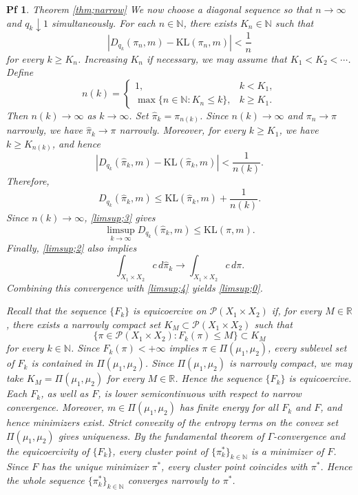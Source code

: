 \documentclass[10pt,a4paper]{amsart}
\newtheorem{pf}{Pf}
\newcommand{\N}{\mathbb N}
\newcommand{\R}{\mathbb R}
\begin{document}
\begin{pf}{Theorem \ref{thm;narrow}}
We now choose a diagonal sequence so that $n\to\infty$ and $q_k\downarrow1$ simultaneously. For each $n\in\N$, there exists $K_n\in\N$ such that
\begin{equation*}
|D_{q_k}(\pi_n,m)-\mathrm{KL}(\pi_n,m)|<\frac{1}{n}
\end{equation*}
for every $k\geq K_n$. Increasing $K_n$ if necessary, we may assume that $K_1<K_2<\cdots$. Define
\begin{equation*}
n(k)=
\begin{cases}
1, & k<K_1,\\
\max\{n\in\N:K_n\leq k\}, & k\geq K_1.
\end{cases}
\end{equation*}
Then $n(k)\to\infty$ as $k\to\infty$. Set $\hat{\pi}_k=\pi_{n(k)}$. Since $n(k)\to\infty$ and $\pi_n\to\pi$ narrowly, we have $\hat{\pi}_k\to\pi$ narrowly. Moreover, for every $k\geq K_1$, we have $k\geq K_{n(k)}$, and hence
\begin{equation*}
|D_{q_k}(\hat{\pi}_k,m)-\mathrm{KL}(\hat{\pi}_k,m)|<\frac{1}{n(k)}.
\end{equation*}
Therefore,
\begin{equation*}
D_{q_k}(\hat{\pi}_k,m)\leq\mathrm{KL}(\hat{\pi}_k,m)+\frac{1}{n(k)}.
\end{equation*}
Since $n(k)\to\infty$, \eqref{limsup;3} gives
\begin{equation}\label{limsup;4}
\limsup_{k\to\infty}D_{q_k}(\hat{\pi}_k,m)\leq\mathrm{KL}(\pi,m).
\end{equation}
Finally, \eqref{limsup;2} also implies
\begin{equation*}
\int_{X_1\times X_2}c\,d\hat{\pi}_k\to\int_{X_1\times X_2}c\,d\pi.
\end{equation*}
Combining this convergence with \eqref{limsup;4} yields \eqref{limsup;0}.

Recall that the sequence $\{F_k\}$ is equicoercive on $\mathcal{P}(X_1\times X_2)$ if, for every $M\in\R$, there exists a narrowly compact set $K_M\subset\mathcal{P}(X_1\times X_2)$ such that
\begin{equation*}
\{\pi\in\mathcal{P}(X_1\times X_2):F_k(\pi)\leq M\}\subset K_M
\end{equation*}
for every $k\in\N$. Since $F_k(\pi)<+\infty$ implies $\pi\in\Pi(\mu_1,\mu_2)$, every sublevel set of $F_k$ is contained in $\Pi(\mu_1,\mu_2)$. Since $\Pi(\mu_1,\mu_2)$ is narrowly compact, we may take $K_M=\Pi(\mu_1,\mu_2)$ for every $M\in\R$. Hence the sequence $\{F_k\}$ is equicoercive. Each $F_k$, as well as $F$, is lower semicontinuous with respect to narrow convergence. Moreover, $m\in\Pi(\mu_1,\mu_2)$ has finite energy for all $F_k$ and $F$, and hence minimizers exist. Strict convexity of the entropy terms on the convex set $\Pi(\mu_1,\mu_2)$ gives uniqueness. By the fundamental theorem of $\Gamma$-convergence and the equicoercivity of $\{F_k\}$, every cluster point of $\{\pi_k^*\}_{k\in\N}$ is a minimizer of $F$. Since $F$ has the unique minimizer $\pi^*$, every cluster point coincides with $\pi^*$. Hence the whole sequence $\{\pi_k^*\}_{k\in\N}$ converges narrowly to $\pi^*$.
\end{pf}
\end{document}
